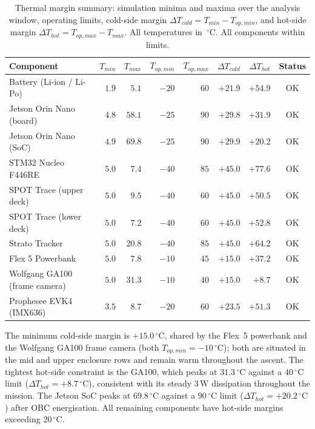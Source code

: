\documentclass[11pt,a4paper]{article}
\newcommand{\degC}{\,^{\circ}\mathrm{C}}
\newcommand{\unit}[1]{\,\mathrm{#1}}
\begin{document}
\begin{table}[H]
\centering
\caption{Thermal margin summary: simulation minima and maxima over the analysis
window, operating limits, cold-side margin $\Delta T_{cold}=T_{min}-T_{op,min}$,
and hot-side margin $\Delta T_{hot}=T_{op,max}-T_{max}$. All temperatures in
$\degC$. All components within limits.}
\label{tab:results}
\begin{tabular}{p{4.8cm} r r r r r r c}
\toprule
Component & $T_{min}$ & $T_{max}$ & $T_{op,min}$ & $T_{op,max}$ &
  $\Delta T_{cold}$ & $\Delta T_{hot}$ & Status \\
\midrule
Battery (Li-ion / Li-Po)        & $ 1.9$ & $ 5.1$ & $-20$ & $ 60$ & $+21.9$ & $+54.9$ & OK \\
Jetson Orin Nano (board)        & $ 4.8$ & $58.1$ & $-25$ & $ 90$ & $+29.8$ & $+31.9$ & OK \\
Jetson Orin Nano (SoC)          & $ 4.9$ & $69.8$ & $-25$ & $ 90$ & $+29.9$ & $+20.2$ & OK \\
STM32 Nucleo F446RE             & $ 5.0$ & $ 7.4$ & $-40$ & $ 85$ & $+45.0$ & $+77.6$ & OK \\
SPOT Trace (upper deck)         & $ 5.0$ & $ 9.5$ & $-40$ & $ 60$ & $+45.0$ & $+50.5$ & OK \\
SPOT Trace (lower deck)         & $ 5.0$ & $ 7.2$ & $-40$ & $ 60$ & $+45.0$ & $+52.8$ & OK \\
Strato Tracker                  & $ 5.0$ & $20.8$ & $-40$ & $ 85$ & $+45.0$ & $+64.2$ & OK \\
Flex 5 Powerbank                & $ 5.0$ & $ 7.8$ & $-10$ & $ 45$ & $+15.0$ & $+37.2$ & OK \\
Wolfgang GA100 (frame camera)   & $ 5.0$ & $31.3$ & $-10$ & $ 40$ & $+15.0$ & $+8.7$  & OK \\
Prophesee EVK4 (IMX636)         & $ 3.5$ & $ 8.7$ & $-20$ & $ 60$ & $+23.5$ & $+51.3$ & OK \\
\bottomrule
\end{tabular}
\end{table}

The minimum cold-side margin is $+15.0\degC$, shared by the Flex~5 powerbank and the
Wolfgang GA100 frame camera (both $T_{op,min}=-10\degC$); both are situated in the
mid and upper enclosure rows and remain warm throughout the ascent. The tightest
hot-side constraint is the GA100, which peaks at $31.3\degC$ against a $40\degC$ limit
($\Delta T_{hot}=+8.7\degC$), consistent with its steady $3\unit{W}$ dissipation
throughout the mission. The Jetson SoC peaks at $69.8\degC$ against a $90\degC$ limit
($\Delta T_{hot}=+20.2\degC$) after OBC energisation. All remaining components have
hot-side margins exceeding $20\degC$.
\end{document}
